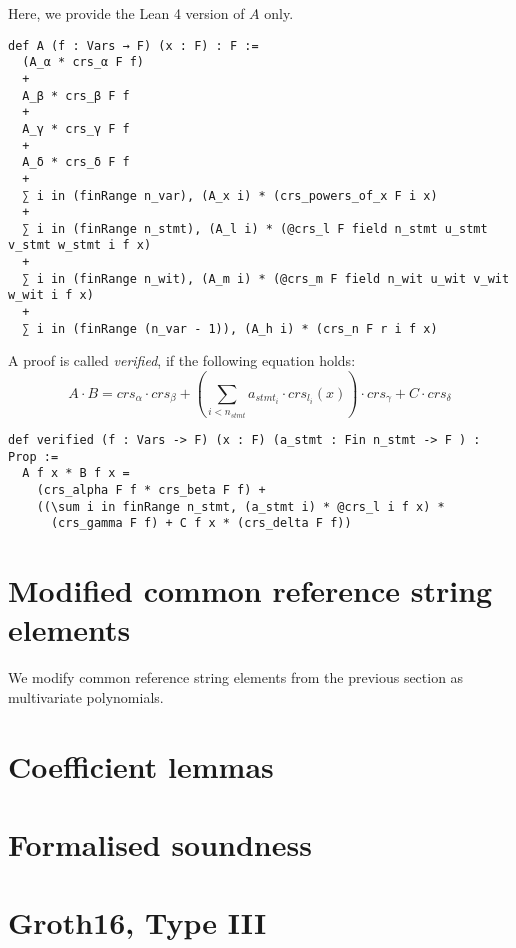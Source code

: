 \documentclass{article}
\theoremstyle{definition}
\theoremstyle{remark}
\begin{document}
Here, we provide the Lean 4 version of $A$ only.

\begin{lstlisting}
def A (f : Vars → F) (x : F) : F :=
  (A_α * crs_α F f)
  +
  A_β * crs_β F f
  +
  A_γ * crs_γ F f
  +
  A_δ * crs_δ F f
  +
  ∑ i in (finRange n_var), (A_x i) * (crs_powers_of_x F i x)
  +
  ∑ i in (finRange n_stmt), (A_l i) * (@crs_l F field n_stmt u_stmt v_stmt w_stmt i f x)
  +
  ∑ i in (finRange n_wit), (A_m i) * (@crs_m F field n_wit u_wit v_wit w_wit i f x)
  +
  ∑ i in (finRange (n_var - 1)), (A_h i) * (crs_n F r i f x)
\end{lstlisting}

A proof is called \emph{verified}, if the following equation holds:
\begin{equation}
A \cdot B = crs_{\alpha} \cdot crs_{\beta} + (\sum \limits_{i < n_{stmt}} a_{{stmt}_i} \cdot crs_{l_i}(x)) \cdot crs_{\gamma} + C \cdot crs_{\delta}
\end{equation}

\begin{lstlisting}
def verified (f : Vars -> F) (x : F) (a_stmt : Fin n_stmt -> F ) : Prop :=
  A f x * B f x =
    (crs_alpha F f * crs_beta F f) +
    ((\sum i in finRange n_stmt, (a_stmt i) * @crs_l i f x) *
      (crs_gamma F f) + C f x * (crs_delta F f))
\end{lstlisting}

\section{Modified common reference string elements}

We modify common reference string elements from the previous section as multivariate polynomials.

\section{Coefficient lemmas}

\section{Formalised soundness}

\section{Groth16, Type III}



\end{document}
